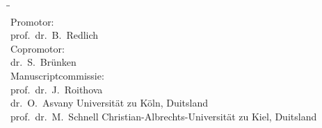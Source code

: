\begin{titlepage}
\begin{center}
    \end{center}
    \clearpage
    \thispagestyle{empty}

    \begin{tabbing}
        \hspace{\tabcolsep}\=\hspace{0.33\textwidth}\=\hspace{0.66\textwidth}\\[-3\medskipamount]

        \> Promotor:\\[\smallskipamount]
        \> prof.\ dr.\ B.\ Redlich\\[\bigskipamount]

        \> Copromotor:\\[\smallskipamount]
        \> dr.\ S.\ Brünken\\[\bigskipamount]
        
        \> Manuscriptcommissie:\\[\smallskipamount]
        \> prof.\ dr.\ J.\ Roithova\\
        \> dr.\ O.\ Asvany \> Universit\"{a}t zu K\"{o}ln, Duitsland\\
        \> prof.\ dr.\ M.\ Schnell \> Christian-Albrechts-Universit\"{a}t zu Kiel, Duitsland\\[\medskipamount]
    \end{tabbing}
\end{titlepage}

